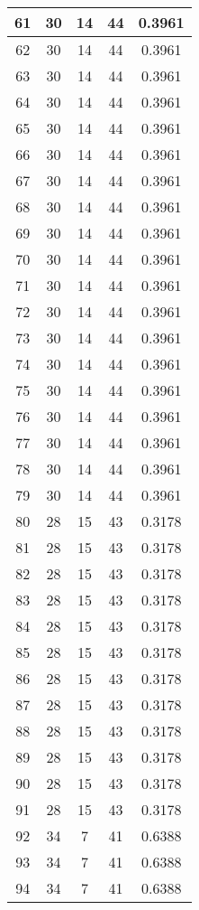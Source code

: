 \documentclass[letterpaper, 12pt]{article}
\begin{document}
\begin{longtable}{|c|c|c|c|c|}
\hline
61 & 30 & 14 & 44 & 0.3961 \\
\hline
62 & 30 & 14 & 44 & 0.3961 \\
\hline
63 & 30 & 14 & 44 & 0.3961 \\
\hline
64 & 30 & 14 & 44 & 0.3961 \\
\hline
65 & 30 & 14 & 44 & 0.3961 \\
\hline
66 & 30 & 14 & 44 & 0.3961 \\
\hline
67 & 30 & 14 & 44 & 0.3961 \\
\hline
68 & 30 & 14 & 44 & 0.3961 \\
\hline
69 & 30 & 14 & 44 & 0.3961 \\
\hline
70 & 30 & 14 & 44 & 0.3961 \\
\hline
71 & 30 & 14 & 44 & 0.3961 \\
\hline
72 & 30 & 14 & 44 & 0.3961 \\
\hline
73 & 30 & 14 & 44 & 0.3961 \\
\hline
74 & 30 & 14 & 44 & 0.3961 \\
\hline
75 & 30 & 14 & 44 & 0.3961 \\
\hline
76 & 30 & 14 & 44 & 0.3961 \\
\hline
77 & 30 & 14 & 44 & 0.3961 \\
\hline
78 & 30 & 14 & 44 & 0.3961 \\
\hline
79 & 30 & 14 & 44 & 0.3961 \\
\hline
80 & 28 & 15 & 43 & 0.3178 \\
\hline
81 & 28 & 15 & 43 & 0.3178 \\
\hline
82 & 28 & 15 & 43 & 0.3178 \\
\hline
83 & 28 & 15 & 43 & 0.3178 \\
\hline
84 & 28 & 15 & 43 & 0.3178 \\
\hline
85 & 28 & 15 & 43 & 0.3178 \\
\hline
86 & 28 & 15 & 43 & 0.3178 \\
\hline
87 & 28 & 15 & 43 & 0.3178 \\
\hline
88 & 28 & 15 & 43 & 0.3178 \\
\hline
89 & 28 & 15 & 43 & 0.3178 \\
\hline
90 & 28 & 15 & 43 & 0.3178 \\
\hline
91 & 28 & 15 & 43 & 0.3178 \\
\hline
92 & 34 & 7 & 41 & 0.6388 \\
\hline
93 & 34 & 7 & 41 & 0.6388 \\
\hline
94 & 34 & 7 & 41 & 0.6388 \\

\end{longtable}
\end{document}
